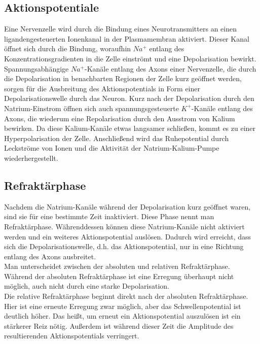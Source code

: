 \documentclass[11pt]{article}
\begin{document}
\subsection{Aktionspotentiale}
Eine Nervenzelle wird durch die Bindung eines Neurotransmitters an einen ligandengesteuerten Ionenkanal in der Plasmamembran aktiviert. Dieser Kanal öffnet sich durch die Bindung, woraufhin $Na^{+}$ entlang des Konzentrationsgradienten in die Zelle einströmt und eine Depolarisation bewirkt. Spannungsabhängige $Na^{+}$-Kanäle entlang des Axons einer Nervenzelle, die durch die Depolarisation in benachbarten Regionen der Zelle kurz geöffnet werden, sorgen für die Ausbreitung des Aktionspotentials in Form einer Depolarisationswelle durch das Neuron. Kurz nach der Depolarisation durch den Natrium-Einstrom öffnen sich auch spannungsgesteuerte $K^+$-Kanäle entlang des Axons, die wiederum eine Repolarisation durch den Ausstrom von Kalium bewirken. Da diese Kalium-Kanäle etwas langsamer schließen, kommt es zu einer Hyperpolarisation der Zelle. Anschließend wird das Ruhepotential durch Leckströme von Ionen und die Aktivität der Natrium-Kalium-Pumpe wiederhergestellt.  

\subsection{Refraktärphase}\label{refraktär}
Nachdem die Natrium-Kanäle während der Depolarisation kurz geöffnet waren, sind sie für eine bestimmte Zeit inaktiviert. Diese Phase nennt man Refraktärphase. Währenddessen können diese Natrium-Kanäle nicht aktiviert werden und ein weiteres Aktionspotential auslösen. Dadurch wird erreicht, dass sich die Depolarisationswelle, d.h. das Aktionspotential, nur in eine Richtung entlang des Axons ausbreitet.   \\
Man unterscheidet zwischen der absoluten und relativen Refraktärphase. Während der absoluten Refraktärphase ist eine Erregung überhaupt nicht möglich, auch nicht durch eine starke Depolarisation. \\
Die relative Refraktärphase beginnt direkt nach der absoluten Refraktärphase. Hier ist eine erneute Erregung zwar möglich, aber das Schwellenpotential ist deutlich höher. Das heißt, um erneut ein Aktionspotential auszulösen ist ein stärkerer Reiz nötig. Außerdem ist während dieser Zeit die Amplitude des resultierenden Aktionspotentials verringert. 
\end{document}

